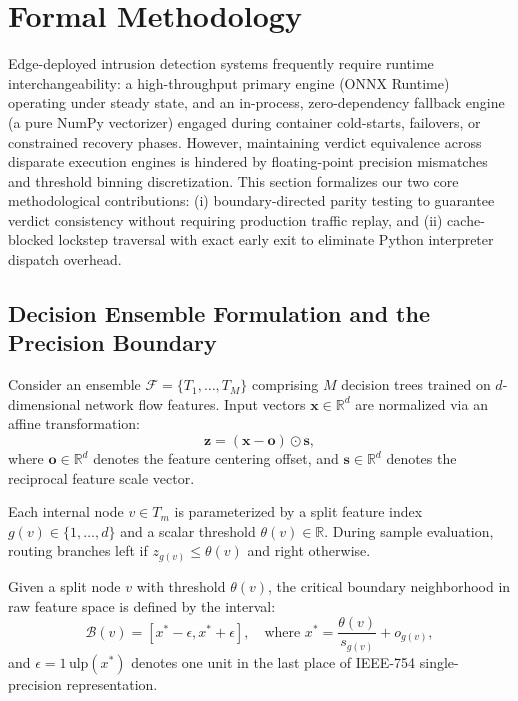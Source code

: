 \section{Formal Methodology}
\label{sec:methodology}

Edge-deployed intrusion detection systems frequently require runtime interchangeability: a high-throughput primary engine (\eg ONNX Runtime) operating under steady state, and an in-process, zero-dependency fallback engine (\eg a pure NumPy vectorizer) engaged during container cold-starts, failovers, or constrained recovery phases. However, maintaining verdict equivalence across disparate execution engines is hindered by floating-point precision mismatches and threshold binning discretization. This section formalizes our two core methodological contributions: (i) boundary-directed parity testing to guarantee verdict consistency without requiring production traffic replay, and (ii) cache-blocked lockstep traversal with exact early exit to eliminate Python interpreter dispatch overhead.

\subsection{Decision Ensemble Formulation and the Precision Boundary}

Consider an ensemble $\mathcal{F} = \{T_1, \dots, T_M\}$ comprising $M$ decision trees trained on $d$-dimensional network flow features. Input vectors $\mathbf{x} \in \mathbb{R}^d$ are normalized via an affine transformation:
\begin{equation}
\mathbf{z} = (\mathbf{x} - \mathbf{o}) \odot \mathbf{s},
\end{equation}
where $\mathbf{o} \in \mathbb{R}^d$ denotes the feature centering offset, and $\mathbf{s} \in \mathbb{R}^d$ denotes the reciprocal feature scale vector.

Each internal node $v \in T_m$ is parameterized by a split feature index $g(v) \in \{1, \dots, d\}$ and a scalar threshold $\theta(v) \in \mathbb{R}$. During sample evaluation, routing branches left if $z_{g(v)} \le \theta(v)$ and right otherwise. 

\begin{definition}
Given a split node $v$ with threshold $\theta(v)$, the critical boundary neighborhood in raw feature space is defined by the interval:
\begin{equation}
\mathcal{B}(v) = \left[ x^* - \epsilon, x^* + \epsilon \right], \quad \text{where } x^* = \frac{\theta(v)}{s_{g(v)}} + o_{g(v)},
\end{equation}
and $\epsilon = 1\,\text{ulp}(x^*)$ denotes one unit in the last place of IEEE-754 single-precision representation.
\end{definition}

